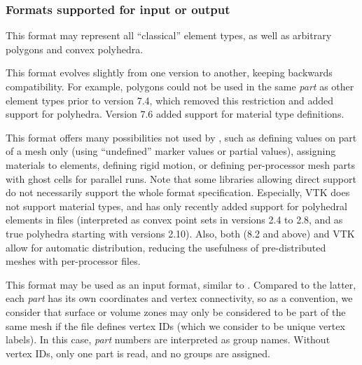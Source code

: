 {{{%
\subsubsection{Formats supported for input or output\label{cha:formats_inout}}

\subsubsubsection{\ensightg%
\label{fmtdesc:ensightg}}

This format may represent all ``classical'' element types, as well as
arbitrary polygons and convex polyhedra.

This format evolves slightly from one \ensight version to another, keeping
backwards compatibility. For example, polygons could not be used in the
same \emph{part} as other element types prior to version 7.4, which removed
this restriction and added support for polyhedra. Version 7.6 added support
for material type definitions.

This format offers many possibilities not used by \CS, such as defining
values on part of a mesh only (using ``undefined'' marker values or
partial values), assigning materials to elements, defining rigid
motion, or defining per-processor mesh parts with ghost cells for
parallel runs. Note that some libraries allowing direct \ensightg support
do not necessarily support the whole format specification.
Especially, VTK does not support material types, and has only recently
added support for polyhedral elements in \ensightg files (interpreted
as convex point sets in \paraview versions 2.4 to 2.8, and as true
polyhedra starting with \paraview versions 2.10).
Also, both \ensightg (8.2 and above) and VTK allow for automatic distribution,
reducing the usefulness of pre-distributed meshes with per-processor files.

This format may be used as an input format, similar to .
Compared to the latter, each \emph{part} has its own coordinates and vertex
connectivity, so as a convention, we consider that surface or
volume zones may only be considered to be part of the same mesh
if the file defines vertex IDs (which we consider to be
unique vertex labels). In this case, \emph{part} numbers
are interpreted as group names. Without vertex IDs, only one part is read,
and no groups are assigned.

}}}
